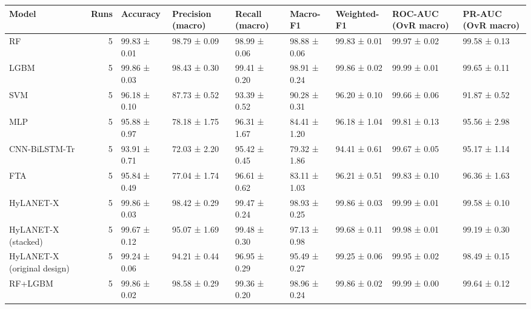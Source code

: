 \begin{tabular}{lrlllllll}
\toprule
Model & Runs & Accuracy & Precision (macro) & Recall (macro) & Macro-F1 & Weighted-F1 & ROC-AUC (OvR macro) & PR-AUC (OvR macro) \\
\midrule
RF & 5 & 99.83 ± 0.01 & 98.79 ± 0.09 & 98.99 ± 0.06 & 98.88 ± 0.06 & 99.83 ± 0.01 & 99.97 ± 0.02 & 99.58 ± 0.13 \\
LGBM & 5 & 99.86 ± 0.03 & 98.43 ± 0.30 & 99.41 ± 0.20 & 98.91 ± 0.24 & 99.86 ± 0.02 & 99.99 ± 0.01 & 99.65 ± 0.11 \\
SVM & 5 & 96.18 ± 0.10 & 87.73 ± 0.52 & 93.39 ± 0.52 & 90.28 ± 0.31 & 96.20 ± 0.10 & 99.66 ± 0.06 & 91.87 ± 0.52 \\
MLP & 5 & 95.88 ± 0.97 & 78.18 ± 1.75 & 96.31 ± 1.67 & 84.41 ± 1.20 & 96.18 ± 1.04 & 99.81 ± 0.13 & 95.56 ± 2.98 \\
CNN-BiLSTM-Tr & 5 & 93.91 ± 0.71 & 72.03 ± 2.20 & 95.42 ± 0.45 & 79.32 ± 1.86 & 94.41 ± 0.61 & 99.67 ± 0.05 & 95.17 ± 1.14 \\
FTA & 5 & 95.84 ± 0.49 & 77.04 ± 1.74 & 96.61 ± 0.62 & 83.11 ± 1.03 & 96.21 ± 0.51 & 99.83 ± 0.10 & 96.36 ± 1.63 \\
HyLANET-X & 5 & 99.86 ± 0.03 & 98.42 ± 0.29 & 99.47 ± 0.24 & 98.93 ± 0.25 & 99.86 ± 0.03 & 99.99 ± 0.01 & 99.58 ± 0.10 \\
HyLANET-X (stacked) & 5 & 99.67 ± 0.12 & 95.07 ± 1.69 & 99.48 ± 0.30 & 97.13 ± 0.98 & 99.68 ± 0.11 & 99.98 ± 0.01 & 99.19 ± 0.30 \\
HyLANET-X (original design) & 5 & 99.24 ± 0.06 & 94.21 ± 0.44 & 96.95 ± 0.29 & 95.49 ± 0.27 & 99.25 ± 0.06 & 99.95 ± 0.02 & 98.49 ± 0.15 \\
RF+LGBM & 5 & 99.86 ± 0.02 & 98.58 ± 0.29 & 99.36 ± 0.20 & 98.96 ± 0.24 & 99.86 ± 0.02 & 99.99 ± 0.00 & 99.64 ± 0.12 \\
\bottomrule
\end{tabular}
